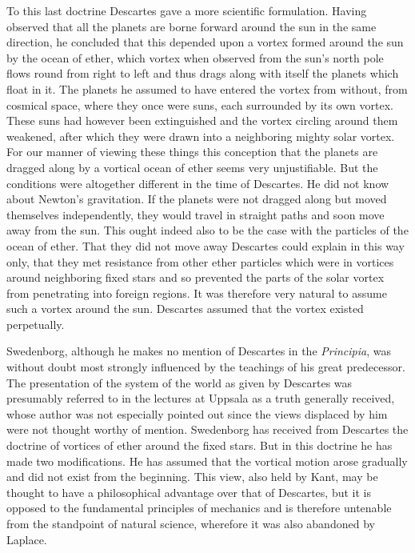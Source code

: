 \documentclass[a4paper, 11pt, oneside, polutonikogreek, english]{article}
\begin{document}
To this last doctrine Descartes gave a more scientific formulation. Having observed that all the planets are borne forward around the sun in the same direction, he concluded that this depended upon a vortex formed around the sun by the ocean of ether, which vortex when observed from the sun's north pole flows round from right to left and thus drags along with itself the planets which float in it. The planets he assumed to have entered the vortex from without, from cosmical space, where they once were suns, each surrounded by its own vortex. These suns had however been extinguished and the vortex circling around them weakened, after which they were drawn into a neighboring mighty solar vortex. For our manner of viewing these things this conception that the planets are dragged along by a vortical ocean of ether seems very unjustifiable. But the conditions were altogether different in the time of Descartes. He did not know about Newton's gravitation. If the planets were not dragged along but moved themselves independently, they would travel in straight paths and soon move away from the sun. This ought indeed also to be the case with the particles of the ocean of ether. That they did not move away Descartes could explain in this way only, that they met resistance from other ether particles which were in vortices around neighboring fixed stars and so prevented the parts of the solar vortex from penetrating into foreign regions. It was therefore very natural to assume such a vortex around the sun. Descartes assumed that the vortex existed perpetually.

Swedenborg, although he makes no mention of Descartes in the \emph{Principia}, was without doubt most strongly influenced by the teachings of his great predecessor. The presentation of the system of the world as given by Descartes was presumably referred to in the lectures at Uppsala as a truth generally received, whose author was not especially pointed out since the views displaced by him were not thought worthy of mention. Swedenborg has received from Descartes the doctrine of vortices of ether around the fixed stars. But in this doctrine he has made two modifications. He has assumed that the vortical motion arose gradually and did not exist from the beginning. This view, also held by Kant, may be thought to have a philosophical advantage over that of Descartes, but it is opposed to the fundamental principles of mechanics and is therefore untenable from the standpoint of natural science, wherefore it was also abandoned by Laplace.
\end{document}
